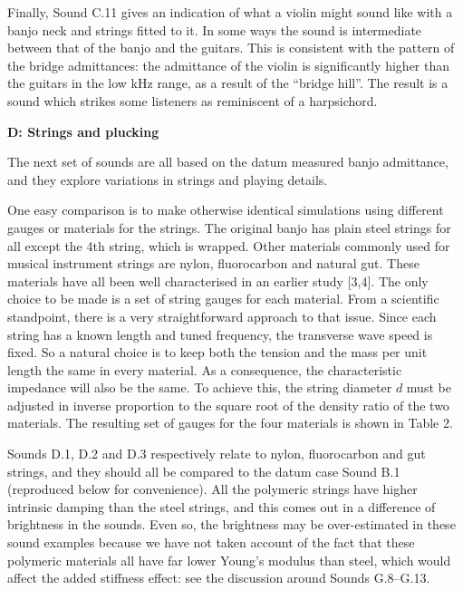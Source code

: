 
  Finally, Sound C.11 gives an indication of what a violin might sound like 
  with a banjo neck and strings fitted to it. In some ways the sound is 
  intermediate between that of the banjo and the guitars. This is consistent 
  with the pattern of the bridge admittances: the admittance of the violin is 
  significantly higher than the guitars in the low kHz range, as a result of 
  the ``bridge hill''. The result is a sound which strikes some listeners as 
  reminiscent of a harpsichord. 


  \textbf{D: Strings and plucking} 

  The next set of sounds are all based on the datum measured banjo admittance, 
  and they explore variations in strings and playing details. 

  One easy comparison is to make otherwise identical simulations using 
  different gauges or materials for the strings. The original banjo has plain 
  steel strings for all except the 4th string, which is wrapped. Other 
  materials commonly used for musical instrument strings are nylon, 
  fluorocarbon and natural gut. These materials have all been well 
  characterised in an earlier study [3,4]. The only choice to be made is a set 
  of string gauges for each material. From a scientific standpoint, there is a 
  very straightforward approach to that issue. Since each string has a known 
  length and tuned frequency, the transverse wave speed is fixed. So a natural 
  choice is to keep both the tension and the mass per unit length the same in 
  every material. As a consequence, the characteristic impedance will also be 
  the same. To achieve this, the string diameter $d$ must be adjusted in 
  inverse proportion to the square root of the density ratio of the two 
  materials. The resulting set of gauges for the four materials is shown in 
  Table 2. 

  Sounds D.1, D.2 and D.3 respectively relate to nylon, fluorocarbon and gut 
  strings, and they should all be compared to the datum case Sound B.1 
  (reproduced below for convenience). All the polymeric strings have higher 
  intrinsic damping than the steel strings, and this comes out in a difference 
  of brightness in the sounds. Even so, the brightness may be over-estimated in 
  these sound examples because we have not taken account of the fact that these 
  polymeric materials all have far lower Young's modulus than steel, which 
  would affect the added stiffness effect: see the discussion around Sounds 
  G.8--G.13. 

